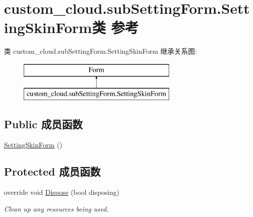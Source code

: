\hypertarget{classcustom__cloud_1_1sub_setting_form_1_1_setting_skin_form}{}\section{custom\+\_\+cloud.\+sub\+Setting\+Form.\+Setting\+Skin\+Form类 参考}
\label{classcustom__cloud_1_1sub_setting_form_1_1_setting_skin_form}
类 custom\+\_\+cloud.\+sub\+Setting\+Form.\+Setting\+Skin\+Form 继承关系图\+:\begin{figure}[H]
\begin{center}
\leavevmode
\includegraphics[height=2.000000cm]{classcustom__cloud_1_1sub_setting_form_1_1_setting_skin_form}
\end{center}
\end{figure}
\subsection*{Public 成员函数}
\begin{DoxyCompactItemize}
\item 
\hyperlink{classcustom__cloud_1_1sub_setting_form_1_1_setting_skin_form_aaa1f418aac7f563d866920c1b854cdd1}{Setting\+Skin\+Form} ()
\end{DoxyCompactItemize}
\subsection*{Protected 成员函数}
\begin{DoxyCompactItemize}
\item 
override void \hyperlink{classcustom__cloud_1_1sub_setting_form_1_1_setting_skin_form_aea96bd735f5cebec96db6f27810e147d}{Dispose} (bool disposing)
\begin{DoxyCompactList}\small\item\em Clean up any resources being used. \end{DoxyCompactList}\end{DoxyCompactItemize}
